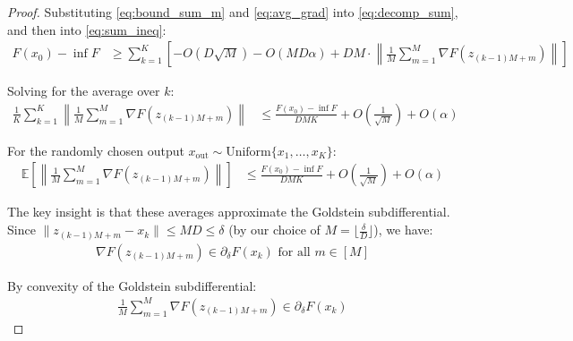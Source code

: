 \documentclass[letterpaper]{article} %
\newcommand{\1}{\mathbf{1}}
\begin{document}
\begin{proof}
Substituting \eqref{eq:bound_sum_m} and \eqref{eq:avg_grad} into \eqref{eq:decomp_sum}, and then into \eqref{eq:sum_ineq}:
\begin{align}
F(x_0) - \inf F &\geq \sum_{k=1}^K \left[- O(D \sqrt{M}) - O(M D\alpha) + D M \cdot \left\|\frac{1}{M}\sum_{m=1}^M \nabla F(z_{(k-1)M+m})\right\|\right] \label{eq:rearranged_ineq}
\end{align}

Solving for the average over $k$:
\begin{align}
\frac{1}{K}\sum_{k=1}^K \left\|\frac{1}{M}\sum_{m=1}^M \nabla F(z_{(k-1)M+m})\right\| &\leq \frac{F(x_0) - \inf F}{D M K} + O(\frac{1}{\sqrt{M}}) + O(\alpha) \label{eq:avg_bound}
\end{align}

For the randomly chosen output $x_{\text{out}} \sim \text{Uniform}\{x_1, \ldots, x_K\}$:
\begin{align}
\mathbb{E}\left[\left\|\frac{1}{M}\sum_{m=1}^M \nabla F(z_{(k-1)M+m})\right\|\right] &\leq \frac{F(x_0) - \inf F}{D M K} + O(\frac{1}{\sqrt{M}}) + O(\alpha) \label{eq:expectation_bound}
\end{align}


The key insight is that these averages approximate the Goldstein subdifferential. Since $\|z_{(k-1)M+m} - x_k\| \leq M D \leq \delta$ (by our choice of $M = \lfloor\frac{\delta}{D}\rfloor$), we have:
\begin{align}
\nabla F(z_{(k-1)M+m}) \in \partial_\delta F(x_k) \text{ for all } m \in [M] \label{eq:subdiff_membership}
\end{align}

By convexity of the Goldstein subdifferential:
\begin{align}
\frac{1}{M}\sum_{m=1}^M \nabla F(z_{(k-1)M+m}) \in \partial_\delta F(x_k) \label{eq:avg_in_subdiff}
\end{align}


\end{proof}
\end{document}
